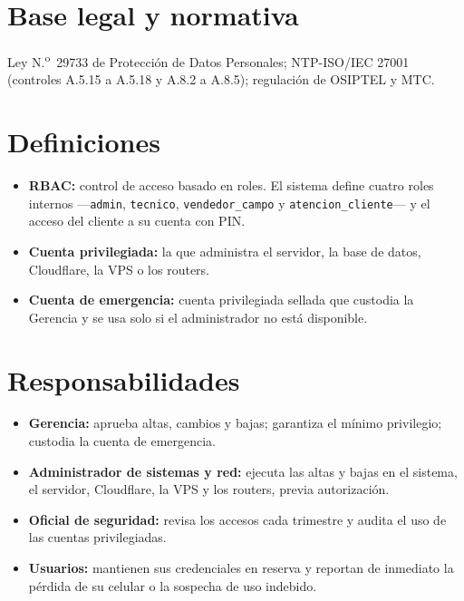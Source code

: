 \section{Base legal y normativa}
Ley N.\textsuperscript{o}~29733 de Protección de Datos Personales; NTP-ISO/IEC 27001
(controles A.5.15 a A.5.18 y A.8.2 a A.8.5); regulación de OSIPTEL y MTC.

\section{Definiciones}
\begin{itemize}
  \item \textbf{RBAC:} control de acceso basado en roles. El sistema define cuatro roles
  internos ---\texttt{admin}, \texttt{tecnico}, \texttt{vendedor\_campo} y
  \texttt{atencion\_cliente}--- y el acceso del cliente a su cuenta con PIN.
  \item \textbf{Cuenta privilegiada:} la que administra el servidor, la base de datos,
  Cloudflare, la VPS o los routers.
  \item \textbf{Cuenta de emergencia:} cuenta privilegiada sellada que custodia la Gerencia y
  se usa solo si el administrador no está disponible.
\end{itemize}

\section{Responsabilidades}
\begin{itemize}
  \item \textbf{Gerencia:} aprueba altas, cambios y bajas; garantiza el mínimo privilegio;
  custodia la cuenta de emergencia.
  \item \textbf{Administrador de sistemas y red:} ejecuta las altas y bajas en el sistema, el
  servidor, Cloudflare, la VPS y los routers, previa autorización.
  \item \textbf{Oficial de seguridad:} revisa los accesos cada trimestre y audita el uso de las
  cuentas privilegiadas.
  \item \textbf{Usuarios:} mantienen sus credenciales en reserva y reportan de inmediato la
  pérdida de su celular o la sospecha de uso indebido.
\end{itemize}

